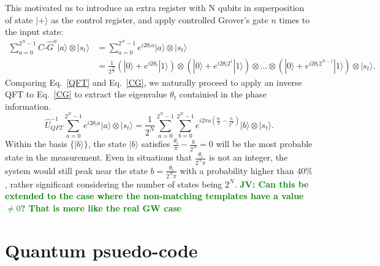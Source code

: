 \documentclass[aps,prd,nofootinbib,twocolumn,reprint,superscriptaddress,showpacs,showkeys,longbibliography]{revtex4-1}
\newcommand{\ket}[1]{|#1\rangle}
\newcommand{\jv}[1]{\textbf{\textcolor{green}{JV: #1}}}
\begin{document}
This motivated us to introduce an extra register with N qubits in superposition of state $\ket{+}$ as the control register, and apply controlled Grover's gate $n$ times to the input state:
\begin{equation}
\begin{split}
   \label{CG}
    \sum_{a=0}^{2^N-1}C\text{-}\hat{G}^a\ket{a}\otimes \ket{s_t}&=\sum_{a=0}^{2^N-1}e^{i2\theta_t a}\ket{a}\otimes\ket{s_t}\\
    &=\frac{1}{2^{\frac{N}{2}}}(\ket{0}+e^{i2\theta_t }\ket{1})\otimes(\ket{0}+e^{i2\theta_t2^1}\ket{1})\otimes...\otimes(\ket{0}+e^{i2\theta_t2^{N-1}}\ket{1})\otimes\ket{s_t}.
\end{split}
\end{equation}
Comparing Eq.~\ref{QFT} and Eq.~\ref{CG}, we naturally proceed to apply an inverse QFT to Eq.~\ref{CG} to extract the eigenvalue $\theta_t$ containied in the phase information.
\begin{equation}
   \label{InverQFT}
   \hat{U}^{-1}_{QFT}\sum_{a=0}^{2^N-1}e^{i2\theta_t a}\ket{a}\otimes\ket{s_t}=\frac{1}{2^{N}}\sum_{a=0}^{2^N-1} \sum_{b=0}^{2^N-1} e^{i2\pi a(\frac{\theta_t}{\pi}-\frac{b}{2^N})}\ket{b}\otimes\ket{s_t}.%
\end{equation}
Within the basis $\{\ket{b}\}$, the state $\ket{b}$ satisfies $\frac{\theta_t}{\pi}-\frac{b}{2^N}=0$ will be the most probable state in the measurement. Even in situations that $\frac{\theta_t}{2^N\pi}$ is not an integer, the system would still peak near the state $b=\frac{\theta_t}{2^N\pi}$ with a probability higher than $40\%$\cite{nielsen2011quantum}, rather significant considering the number of states being $2^N$.
\jv{Can this be extended to the case where the non-matching templates have a value $\neq0$? That is more like the real GW case}

\section{Quantum psuedo-code}\label{sec:psuedocode}
\end{document}
